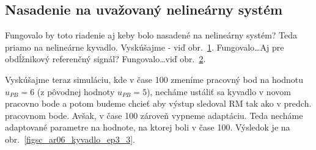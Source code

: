\documentclass[a4paper, 10pt, ]{article}
\begin{document}
\clearpage


\subsection{Nasadenie na uvažovaný nelineárny systém}


Fungovalo by toto riadenie aj keby bolo nasadené na nelineárny systém? Teda priamo na nelineárne kyvadlo. Vyskúšajme - viď obr.~\ref{figsc_ar06_kyvadlo_ep3_1}. Fungovalo\ldots Aj pre obdĺžnikový referenčný signál? Fungovalo\ldots viď obr.~\ref{figsc_ar06_kyvadlo_ep3_2}.




\begin{figure}[!b]
	\centering

    \vspace{-3mm}


    \vspace{-2mm}

	\caption{}
	\label{figsc_ar06_kyvadlo_ep3_1}


    \vspace{-2mm}

\end{figure}










\begin{figure}[!b]
	\centering

    \vspace{-3mm}


    \vspace{-2mm}

	\caption{}
	\label{figsc_ar06_kyvadlo_ep3_2}


    \vspace{-2mm}

\end{figure}






Vyskúšajme teraz simuláciu, kde v čase 100 zmeníme pracovný bod na hodnotu $u_{PB} = 6$ (z pôvodnej hodnoty $u_{PB} = 5$), necháme ustáliť sa kyvadlo v novom pracovno bode a potom budeme chcieť aby výstup sledoval RM tak ako v predch. pracovnom bode. Avšak, v čase 100 zároveň vypneme adaptáciu. Teda necháme adaptované parametre na hodnote, na ktorej boli v čase 100. Výsledok je na obr.~\ref{figsc_ar06_kyvadlo_ep3_3}.
\end{document}
